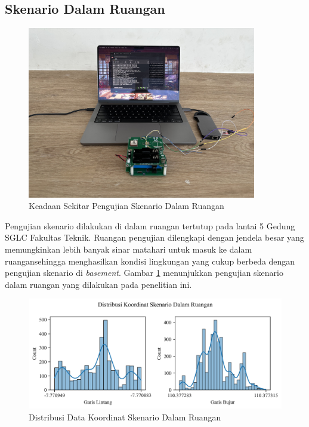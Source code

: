 \subsection{Skenario Dalam Ruangan}
\begin{figure}[H]
	\centering
	\includegraphics[width=10cm]{contents/chapter-4/2-skenario-indoor/keadaan.jpg}
	\caption{Keadaan Sekitar Pengujian Skenario Dalam Ruangan}
	\label{Fig: indoor-keadaan}
\end{figure}

Pengujian skenario dilakukan di dalam ruangan tertutup pada lantai 5 Gedung SGLC Fakultas Teknik. Ruangan pengujian dilengkapi dengan jendela besar yang memungkinkan lebih banyak sinar matahari untuk masuk ke dalam ruangansehingga menghasilkan kondisi lingkungan yang cukup berbeda dengan pengujian skenario di \textit{basement}. Gambar \ref{Fig: indoor-keadaan} menunjukkan pengujian skenario dalam ruangan yang dilakukan pada penelitian ini.

\begin{figure}[H]
	\centering
	\begin{adjustbox}{width=\textwidth}
		\includegraphics{contents/chapter-4/2-skenario-indoor/distribution.png}
	\end{adjustbox}
	\caption{Distribusi Data Koordinat Skenario Dalam Ruangan}
	\label{Fig:indoor-distribution}
\end{figure}

